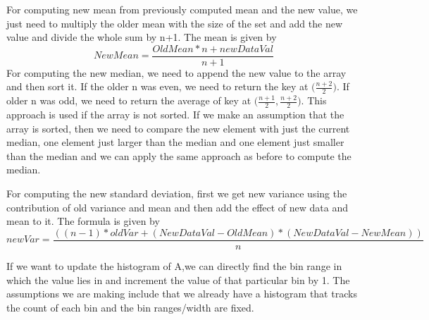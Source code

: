 \begin{tcolorbox}[breakable]
	\begin{sol}
		For computing new mean from previously computed mean and the new value, we just need to multiply the older mean with the size of the set and add the new value and divide the whole sum by n+1. The mean is given by
  \begin{equation}
      NewMean=\frac{OldMean*n+newDataVal}{n+1}
  \end{equation}
  For computing the new median, we need to append the new value to the array and then sort it. If the older n was even, we need to return the key at $\big(\frac{n+2}{2}\big)$. If older n was odd, we need to return the average of key at $\big(\frac{n+1}{2},\frac{n+2}{2}\big)$. This approach is used if the array is not sorted. If we make an assumption that the array is sorted, then we need to compare the new element with just the current median, one element just larger than the median and one element just smaller than the median and we can apply the same approach as before to compute the median. 
  \par For computing the new standard deviation, first we get new variance using the contribution of old variance and mean and then add the effect of new data and mean to it. The formula is given by 
  \begin{equation}
      newVar=\frac{((n-1)*oldVar+(NewDataVal-OldMean)*(NewDataVal-NewMean))}{n}
  \end{equation}
 
  \par If we want to update the histogram of A,we can directly find the bin range in which the value lies in and increment the value of that particular bin by 1.
  The assumptions we are making include that we already have a histogram that tracks the count of each bin and the bin ranges/width are fixed.
	\end{sol}
\end{tcolorbox}
